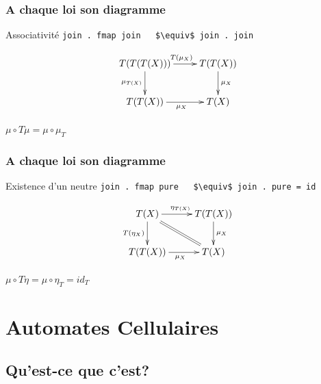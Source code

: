 \documentclass{beamer}
\begin{document}
\begin{frame}
\frametitle{A chaque loi son diagramme}
\begin{alertblock}{Associativité}
\verb!join . fmap join   $\equiv$ join . join!
\end{alertblock}

\begin{block}{}

\[
\xymatrix{
T(T(T(X))) \ar[r]^{T(\mu_X)} \ar[d]_{\mu_{T(X)}} & T(T(X)) \ar[d]^{\mu_X} \\
T(T(X)) \ar[r]_{\mu_X} & T(X) \\
}
\]
\end{block}

\begin{block}{}
\begin{center}
$\mu \circ T\mu = \mu \circ \mu_T$
\end{center}
\end{block}

\end{frame}

\begin{frame}
\frametitle{A chaque loi son diagramme}
\begin{alertblock}{Existence d'un neutre}
\verb!join . fmap pure   $\equiv$ join . pure = id!
\end{alertblock}

\begin{block}{}
\[
\xymatrix{
T(X) \ar[r]^{\eta_{T(X)}} \ar[d]_{T(\eta_X)}  \ar@{=}[dr] & T(T(X)) \ar[d]^{\mu_X} \\
T(T(X)) \ar[r]_{\mu_X} & T(X) \\
}
\]
\end{block}

\begin{block}{}
\begin{center}
$\mu \circ T \eta = \mu \circ \eta_T = id_T$
\end{center}
\end{block}

\end{frame}


\section{Automates Cellulaires}

\subsection{Qu'est-ce que c'est?}
\end{document}
